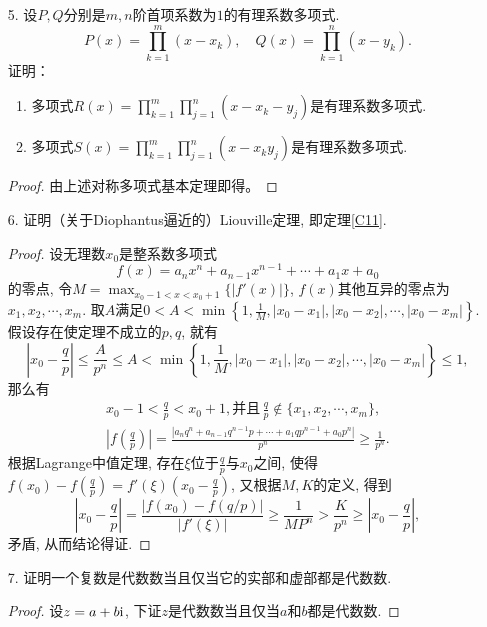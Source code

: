 \begin{1b}
\begin{enumerate}
\begin{proof}
若\(h\ne 0\), 考虑\[h'=f(x_1,x_2,\cdots,x_{n})-h(\sigma_1,\sigma_2,\cdots,\sigma_{n-1}),\]
易见\(x_n=0\)时\(h'=0\), 类似\(h=0\)的讨论考虑\(\frac{h'}{x_1x_2\cdots x_n}\), 它的次数也为\(\deg f -n\). 依归纳假设便完成了证明.
\end{proof}
\item[5.] 设\(P,Q\)分别是\(m,n\)阶首项系数为\(1\)的有理系数多项式.
\[P(x)=\prod_{k=1}^{m}(x-x_k),\quad Q(x)=\prod_{k=1}^{n}(x-y_k).\]证明：
        \begin{enumerate}[label=(\arabic*)]
            \item 多项式\(R(x)=\prod_{k=1}^{m}\prod_{j=1}^{n}(x-x_k-y_j)\)是有理系数多项式.
            \item 多项式\(S(x)=\prod_{k=1}^{m}\prod_{j=1}^{n}(x-x_ky_j)\)是有理系数多项式.
        \end{enumerate}
\begin{proof}
    由上述对称多项式基本定理即得。
\end{proof}
\item[6.] 证明（关于Diophantus逼近的）Liouville定理, 即定理\ref{C11}.
\begin{proof}
设无理数\(x_0\)是整系数多项式\[f(x)=a_nx^n+a_{n-1}x^{n-1}+\cdots+a_1x+a_0\]的零点, 
令\(M=\max_{x_0-1<x<x_0+1}\{|f'(x)|\}\), \(f(x)\)其他互异的零点为\(x_1,x_2,\cdots,x_m\). 
取\(A\)满足\(0<A<\min\left\lbrace 1,\frac{1}{M},|x_0-x_1|,|x_0-x_2|,\cdots,|x_0-x_m| \right\rbrace\). 
假设存在使定理不成立的\(p,q\), 就有
\[\left|x_0-\frac{q}{p}\right|\leqslant\frac{A}{p^n}\leqslant A
<\min\left\lbrace 1,\frac{1}{M},|x_0-x_1|,|x_0-x_2|,\cdots,|x_0-x_m| \right\rbrace\leqslant 1,\]那么有
\begin{gather*}
x_0-1<\frac{q}{p}<x_0+1,\text{并且}\,\frac{q}{p}\notin\{x_1,x_2,\cdots,x_m\},\\
\left|f\left(\frac{q}{p}\right)\right|=\frac{\left|a_nq^n+a_{n-1}q^{n-1}p+\cdots+a_1qp^{n-1}+a_0p^n\right|}{p^n}\geqslant\frac{1}{p^n}.
\end{gather*}
根据Lagrange中值定理, 存在\(\xi\)位于\(\frac{q}{p}\)与\(x_0\)之间, 
使得\(f(x_0)-f\left(\frac{q}{p}\right)=f'(\xi)\left(x_0-\frac{q}{p}\right)\), 又根据\(M,K\)的定义, 得到
\[\left|x_0-\frac{q}{p}\right|=\frac{|f(x_0)-f(q/p)|}{|f'(\xi)|}\geqslant\frac{1}{MP^n}>\frac{K}{p^n}\geqslant\left|x_0-\frac{q}{p}\right| ,\]
矛盾, 从而结论得证.
\end{proof}
\item[7.] 证明一个复数是代数数当且仅当它的实部和虚部都是代数数.
\begin{proof}
设\(z=a+b{\rm i}\), 下证\(z\)是代数数当且仅当\(a\)和\(b\)都是代数数.


\end{proof}
\end{enumerate}
\end{1b}
